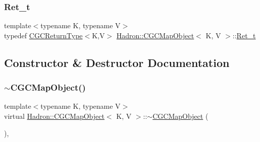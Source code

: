 \mbox{\label{classHadron_1_1CGCMapObject_a154c1c2b41f7dad9d5692b4d2c6f5a2c}} 
\subsubsection{\texorpdfstring{Ret\_t}{Ret\_t}\hspace{0.1cm}{\footnotesize\ttfamily [3/3]}}
{\footnotesize\ttfamily template$<$typename K, typename V$>$ \\
typedef \mbox{\hyperlink{structHadron_1_1CGCReturnType}{C\+G\+C\+Return\+Type}}$<$K,V$>$ \mbox{\hyperlink{classHadron_1_1CGCMapObject}{Hadron\+::\+C\+G\+C\+Map\+Object}}$<$ K, V $>$\+::\mbox{\hyperlink{classHadron_1_1CGCMapObject_a154c1c2b41f7dad9d5692b4d2c6f5a2c}{Ret\+\_\+t}}}



\subsection{Constructor \& Destructor Documentation}
\mbox{\label{classHadron_1_1CGCMapObject_aee79d26f143bad748680b674763b831f}} 
\subsubsection{\texorpdfstring{$\sim$CGCMapObject()}{~CGCMapObject()}\hspace{0.1cm}{\footnotesize\ttfamily [1/3]}}
{\footnotesize\ttfamily template$<$typename K, typename V$>$ \\
virtual \mbox{\hyperlink{classHadron_1_1CGCMapObject}{Hadron\+::\+C\+G\+C\+Map\+Object}}$<$ K, V $>$\+::$\sim$\mbox{\hyperlink{classHadron_1_1CGCMapObject}{C\+G\+C\+Map\+Object}} (\begin{DoxyParamCaption}{ }\end{DoxyParamCaption})\hspace{0.3cm}{\ttfamily [inline]}, {\ttfamily [virtual]}}



